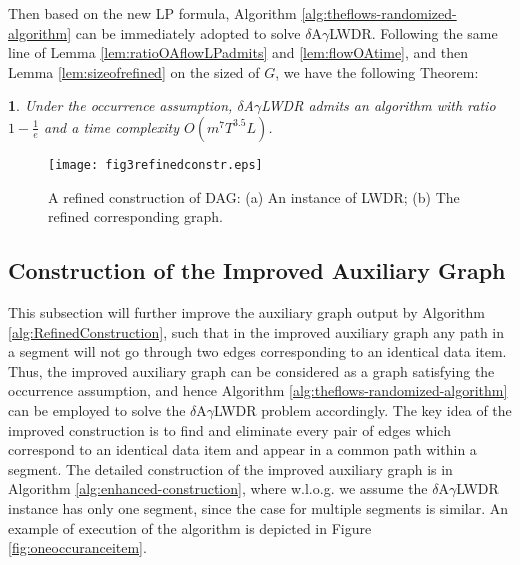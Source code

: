 \documentclass[11pt,english,onecolumn,draftcls]{IEEEtran}
\theoremstyle{plain}
\newtheorem{thm}{\protect\theoremname}
\theoremstyle{plain}
\theoremstyle{plain}
\theoremstyle{plain}
\providecommand{\theoremname}{Theorem}
\begin{document}
Then based on the new LP formula, Algorithm \ref{alg:theflows-randomized-algorithm}
can be immediately adopted to solve $\delta$A$\gamma$LWDR. Following
the same line of Lemma \ref{lem:ratioOAflowLPadmits} and \ref{lem:flowOAtime},
and then Lemma \ref{lem:sizeofrefined} on the sized of $G$, we have
the following Theorem:
\begin{thm}
Under the occurrence assumption, $\delta$A$\gamma$LWDR admits an
algorithm with ratio $1-\frac{1}{e}$ and a time complexity $O(m^{7}T^{3.5}L)$.
\end{thm}
\begin{figure}
\texttt{[image: fig3refinedconstr.eps]}

\protect\caption{\label{fig:A-Refined-Construction}A refined construction of DAG:
(a) An instance of LWDR; (b) The refined corresponding graph. }
\end{figure}



\subsection{Construction of the Improved Auxiliary Graph}

This subsection will further improve the auxiliary graph output by
Algorithm \ref{alg:RefinedConstruction}, such that in the improved
auxiliary graph any path in a segment will not go through two edges
corresponding to an identical data item. Thus, the improved auxiliary
graph can be considered as a graph satisfying the occurrence assumption,
and hence Algorithm \ref{alg:theflows-randomized-algorithm} can be
employed to solve the $\delta$A$\gamma$LWDR problem accordingly.
The key idea of the improved construction is to find and eliminate
every pair of edges which correspond to an identical data item and
appear in a common path within a segment. The detailed construction
of the improved auxiliary graph is in Algorithm \ref{alg:enhanced-construction},
where w.l.o.g. we assume the $\delta$A$\gamma$LWDR instance has
only one segment, since the case for multiple segments is similar.
An example of execution of the algorithm is depicted in Figure \ref{fig:oneoccuranceitem}.
\end{document}
